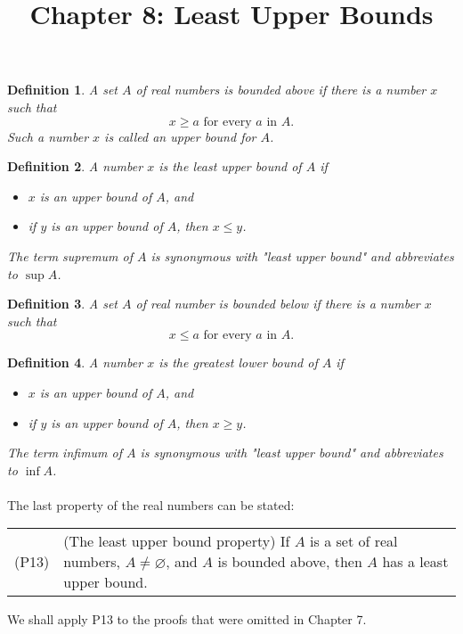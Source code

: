 \documentclass{article}
\newtheorem{definition}{Definition}
\begin{document}
\title{Chapter 8: Least Upper Bounds}
\maketitle

\begin{definition}
  A set $A$ of real numbers is \emph{bounded above} if there is a number $x$
  such that \begin{equation*}
    x \geq a \text{ for every } a \text{ in } A.
  \end{equation*}
  Such a number $x$ is called an \emph{upper bound} for $A$.
\end{definition}

\begin{definition}
  A number $x$ is the \emph{least upper bound} of $A$ if \begin{itemize}
    \item $x$ is an upper bound of $A$, and
    \item if $y$ is an upper bound of $A$, then $x \leq y$.
  \end{itemize}

  The term \emph{supremum} of $A$ is synonymous with "least upper bound" and
  abbreviates to $\sup A$.
\end{definition}

\begin{definition}
  A set $A$ of real number is \emph{bounded below} if there is a number $x$
  such that \begin{equation*}
    x \leq a \text{ for every } a \text{ in } A.
  \end{equation*}
\end{definition}

\begin{definition}
  A number $x$ is the \emph{greatest lower bound} of $A$ if \begin{itemize}
    \item $x$ is an upper bound of $A$, and
    \item if $y$ is an upper bound of $A$, then $x \geq y$.
  \end{itemize}

  The term \emph{infimum} of $A$ is synonymous with "least upper bound" and
  abbreviates to $\inf A$.
\end{definition}

\paragraph{} The last property of the real numbers can be stated:
\begin{tabular}{l p{4in}}
  (P13) & (The least upper bound property) If $A$ is a set of real numbers, $A
  \neq \varnothing$, and $A$ is bounded above, then $A$ has a least upper
  bound.
\end{tabular}
We shall apply P13 to the proofs that were omitted in Chapter 7.
\end{document}
